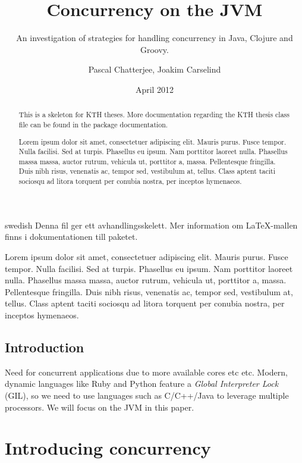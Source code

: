 \documentclass[a4paper,12pt]{kth-mag}
\title{Concurrency on the JVM}
\subtitle{An investigation of strategies for handling concurrency in Java, Clojure and Groovy.}
\author{Pascal Chatterjee, Joakim Carselind}
\date{April 2012}
\begin{document}
\frontmatter
\pagestyle{empty}
\removepagenumbers
\maketitle
{}

\begin{abstract}
  This is a skeleton for KTH theses. More documentation
  regarding the KTH thesis class file can be found in
  the package documentation.

Lorem ipsum dolor sit amet, consectetuer adipiscing elit. Mauris
purus. Fusce tempor. Nulla facilisi. Sed at turpis. Phasellus eu
ipsum. Nam porttitor laoreet nulla. Phasellus massa massa, auctor
rutrum, vehicula ut, porttitor a, massa. Pellentesque fringilla. Duis
nibh risus, venenatis ac, tempor sed, vestibulum at, tellus. Class
aptent taciti sociosqu ad litora torquent per conubia nostra, per
inceptos hymenaeos.
\end{abstract}

\clearpage

\begin{foreignabstract}{swedish}
  Denna fil ger ett avhandlingsskelett.
  Mer information om \LaTeX-mallen finns i
  dokumentationen till paketet.

Lorem ipsum dolor sit amet, consectetuer adipiscing elit. Mauris
purus. Fusce tempor. Nulla facilisi. Sed at turpis. Phasellus eu
ipsum. Nam porttitor laoreet nulla. Phasellus massa massa, auctor
rutrum, vehicula ut, porttitor a, massa. Pellentesque fringilla. Duis
nibh risus, venenatis ac, tempor sed, vestibulum at, tellus. Class
aptent taciti sociosqu ad litora torquent per conubia nostra, per
inceptos hymenaeos.
\end{foreignabstract}

\clearpage

\tableofcontents*
\mainmatter
\pagestyle{newchap}
\makeatletter\@openrightfalse

\chapter{Introduction}

Need for concurrent applications due to more available cores etc etc. Modern, dynamic languages like Ruby and Python feature a \textit{Global Interpreter Lock} (GIL), so we need to use languages such as C/C++/Java to leverage multiple processors. We will focus on the JVM in this paper.

\part{Introducing concurrency}
\end{document}

